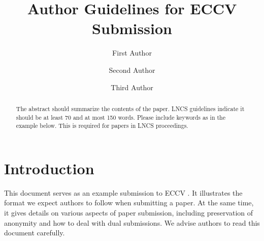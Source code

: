 \documentclass[runningheads]{llncs}
\begin{document}
\title{Author Guidelines for ECCV Submission} 


\author{First Author \and
Second Author \and
Third Author}



\maketitle


\begin{abstract}
  The abstract should summarize the contents of the paper. 
  LNCS guidelines indicate it should be at least 70 and at most 150 words.
  Please include keywords as in the example below. 
  This is required for papers in LNCS proceedings.
\end{abstract}


\section{Introduction}
\label{sec:intro}

This document serves as an example submission to ECCV \ECCVyear{}.
It illustrates the format we expect authors to follow when submitting a paper. 
At the same time, it gives details on various aspects of paper submission, including preservation of anonymity and how to deal with dual submissions.
We advise authors to read this document carefully.
\end{document}
